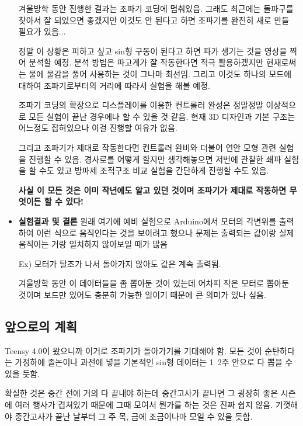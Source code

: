 \begin{itemize}
    겨울방학 동안 진행한 결과는 조파기 코딩에 멈춰있음. 그래도 최근에는 돌파구를 찾아서 잘 되었으면 좋겠지만 이것도 안 된다고 하면 조파기를 완전히 새로 만들 필요가 있음...

    정말 이 상황은 피하고 싶고 sin형 구동이 된다고 하면 파가 생기는 것을 영상을 찍어 분석할 예정. 분석 방법은 파고계가 잘 작동한다면 적극 활용하겠지만 현재로써는 물에 물감을 풀어 사용하는 것이 그나마 최선임. 그리고 이것도 하나의 모드에 대하여 조파기로부터의 거리에 따라서 실험을 해볼 예정.

    조파기 코딩의 확장으로 디스플레이를 이용한 컨트롤러 완성은 정말정말 이상적으로 모든 실험이 끝난 경우에나 할 수 있을 것 같음. 현재 3D 디자인과 기본 구조는 어느정도 잡혀있으나 이걸 진행할 여유가 없음.

    그리고 조파기가 제대로 작동한다면 컨트롤러 완비와 더불어 연안 모형 관련 실험을 진행할 수 있음. 경사로를 어떻게 할지만 생각해놓으면 저번에 관찰한 쇄파 실험을 할 수도 있고 방파제 조적구조 비교 실험을 간단하게 진행할 수도 있음.

    \textbf{사실 이 모든 것은 이미 작년에도 알고 있던 것이며 조파기가 제대로 작동하면 무엇이든 할 수 있다!}    

    \item \textbf{실험결과 및 결론}
    원래 여기에 예비 실험으로 Arduino에서 모터의 각변위를 출력하여 이런 식으로 움직인다는 것을 보이려고 했으나 문제는 출력되는 값이랑 실제 움직이는 거랑 일치하지 않아보일 때가 많음

    Ex) 모터가 탈조가 나서 돌아가지 않아도 값은 계속 출력됨.

    겨울방학 동안 이 데이터들을 좀 뽑아둔 것이 있는데 어차피 작은 모터로 뽑아둔 것이며 보드만 있어도 충분히 가능한 일이기 때문에 큰 의미가 있나 싶음.
    
\end{itemize}

\subsection{앞으로의 계획}
Teensy 4.0이 왔으니까 이거로 조파기가 돌아가기를 기대해야 함. 모든 것이 순탄하다는 가정하에 졸논이나 과전에 넣을 기본적인 sin형 데이터는 1~2주 안으로 다 뽑을 수 있을 듯함.

확실한 것은 중간 전에 거의 다 끝내야 하는데 중간고사가 끝나면 그 굉장히 좋은 시즌에 여러 행사가 겹쳐있기 때문에 그때 모여서 뭔가를 하는 것은 진짜 쉽지 않음. 기껏해야 중간고사가 끝난 날부터 그 주 목, 금에 조금이나마 모일 수 있을 듯함.
